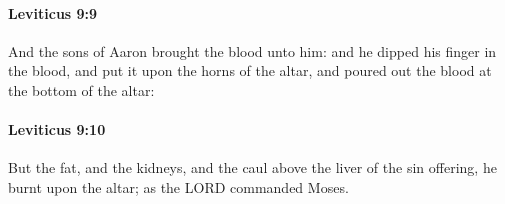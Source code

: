 		\paragraph{Leviticus 9:9} %
			\label{LEVITICUS-9-9}

			And the sons of Aaron brought the blood unto him: and he dipped his finger in the blood, and put it upon the horns of the altar, and poured out the blood at the bottom of the altar:


		\paragraph{Leviticus 9:10} %
			\label{LEVITICUS-9-10}

			But the fat, and the kidneys, and the caul above the liver of the sin offering, he burnt upon the altar; as the LORD commanded Moses.


